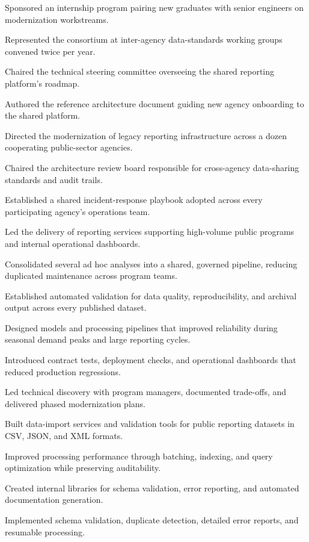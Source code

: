 \documentclass[fontsize=11pt, margin=narrow, medium=print]{careerdossier-resume}
\begin{document}
\begin{CDossierEntry}[title = {Modernization Program}, organization = {Continental Reliability Consortium}, location = {Ottawa, ON}, dates = {2019--Present}]
\begin{CDossierItemize}
    \item Sponsored an internship program pairing new graduates with senior engineers on modernization workstreams.
    \item Represented the consortium at inter-agency data-standards working groups convened twice per year.
    \item Chaired the technical steering committee overseeing the shared reporting platform's roadmap.
    \item Authored the reference architecture document guiding new agency onboarding to the shared platform.
    \item Directed the modernization of legacy reporting infrastructure across a dozen cooperating public-sector agencies.
    \item Chaired the architecture review board responsible for cross-agency data-sharing standards and audit trails.
    \item Established a shared incident-response playbook adopted across every participating agency's operations team.
    \item Led the delivery of reporting services supporting high-volume public programs and internal operational dashboards.
    \item Consolidated several ad hoc analyses into a shared, governed pipeline, reducing duplicated maintenance across program teams.
    \item Established automated validation for data quality, reproducibility, and archival output across every published dataset.
    \item Designed models and processing pipelines that improved reliability during seasonal demand peaks and large reporting cycles.
    \item Introduced contract tests, deployment checks, and operational dashboards that reduced production regressions.
    \item Led technical discovery with program managers, documented trade-offs, and delivered phased modernization plans.
    \item Built data-import services and validation tools for public reporting datasets in CSV, JSON, and XML formats.
    \item Improved processing performance through batching, indexing, and query optimization while preserving auditability.
    \item Created internal libraries for schema validation, error reporting, and automated documentation generation.
    \item Implemented schema validation, duplicate detection, detailed error reports, and resumable processing.

\end{CDossierItemize}
\end{CDossierEntry}
\end{document}
